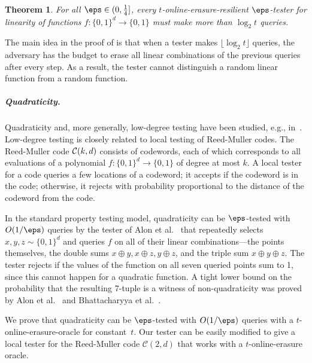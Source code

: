 \documentclass[11pt]{article}
\numberwithin{equation}{section}
\newtheorem{theorem}{Theorem}[section]
\theoremstyle{definition}
\theoremstyle{plain}
\begin{document}
\begin{theorem}\label{thm:linearity_lower}
For all $\eps \in(0, \frac{1}{4}]$, every $t$-online-erasure-resilient $\eps$-tester for linearity of functions $f \colon \{0,1\}^d\to \{0,1\}$ must make more than $\log_2 t$ queries. %
\end{theorem}

The main idea in the proof of  is that when a tester makes $\lfloor\log_2 t\rfloor$ queries, the adversary has the budget to erase all linear combinations of the previous queries after every step. As a result, the tester cannot distinguish a random linear function from a random function.


\subparagraph*{Quadraticity.}
Quadraticity and, more generally, low-degree testing have been studied, e.g.,
in~\cite{BabaiFL91,BabaiFLS91,GemmellLRSW91,FeigeGLSS96,FriedlS95,RubinfeldS96, RazS97, AlonKKLR05, AroraS03, MoshkovitzR08, Moshkovitz17, KaufmanR06, Samorodnitsky07, SamorodnitskyT09, JutlaPRZ09, BKSSZ10,HaramatySS13, Ron-ZewiS13, DinurG13}. 
%
%
Low-degree testing is closely related to local testing of Reed-Muller codes. The %
Reed-Muller code ${\cal C}(k,d)$ 
consists of codewords, each of which corresponds to all evaluations of a  polynomial $f\colon \{0,1\}^d \to \{0,1\}$  of degree at most $k$. %
A local tester for a code queries a few locations of a codeword; it accepts if the codeword is in the code; otherwise, it rejects with probability proportional to the distance of the codeword from the code.


In the standard property testing model, quadraticity can be $\eps$-tested with $O(1/\eps)$ queries by the tester of Alon et al.~\cite{AlonKKLR05} that repeatedly selects $x,y,z\sim\{0,1\}^d$ and queries $f$ on all of their linear combinations---the points themselves, the double sums $x\oplus y,x\oplus z, y\oplus z$, and the triple sum $x\oplus y\oplus z$. The tester rejects if the values of the function on all seven queried points sum to 1, since this cannot happen for a quadratic function.
 A tight lower bound on the probability that the resulting 7-tuple is a witness of non-quadraticity was proved by  Alon et al.~\cite{AlonKKLR05}
 and Bhattacharyya et al.~\cite{BKSSZ10}.


We prove that quadraticity can be $\eps$-tested with $O(1/\eps)$ queries with a $t$-online-erasure-oracle for constant~$t$. 
Our tester can be easily modified to give a local tester for the Reed-Muller code $\mathcal{C}(2,d)$ that works with a $t$-online-erasure oracle.
%
\end{document}
